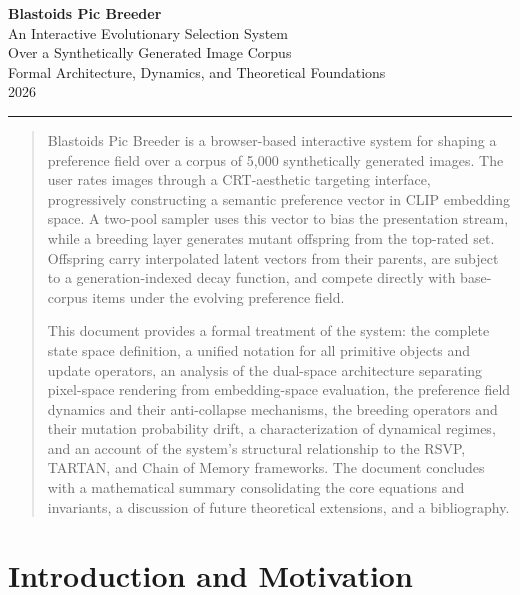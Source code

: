 \documentclass[12pt, a4paper]{article}
\theoremstyle{definition}
\begin{document}
\begin{center}
  {\Large\bfseries\color{termgreen!90!black} Blastoids Pic Breeder}\\[0.6em]
  {\large\color{commentgray} An Interactive Evolutionary Selection System\\
  Over a Synthetically Generated Image Corpus}\\[1.2em]
  {\normalsize\color{commentgray} Formal Architecture, Dynamics, and Theoretical Foundations}\\[0.4em]
  {\small\color{commentgray!70} 2026}
\end{center}

\vspace{1em}
\hrule height 0.5pt
\vspace{1.5em}

\begin{abstract}
\noindent
Blastoids Pic Breeder is a browser-based interactive system for shaping a preference field over a corpus of 5,000 synthetically generated images. The user rates images through a CRT-aesthetic targeting interface, progressively constructing a semantic preference vector in CLIP embedding space. A two-pool sampler uses this vector to bias the presentation stream, while a breeding layer generates mutant offspring from the top-rated set. Offspring carry interpolated latent vectors from their parents, are subject to a generation-indexed decay function, and compete directly with base-corpus items under the evolving preference field.

This document provides a formal treatment of the system: the complete state space definition, a unified notation for all primitive objects and update operators, an analysis of the dual-space architecture separating pixel-space rendering from embedding-space evaluation, the preference field dynamics and their anti-collapse mechanisms, the breeding operators and their mutation probability drift, a characterization of dynamical regimes, and an account of the system's structural relationship to the RSVP, TARTAN, and Chain of Memory frameworks. The document concludes with a mathematical summary consolidating the core equations and invariants, a discussion of future theoretical extensions, and a bibliography.
\end{abstract}

\vspace{1em}
\tableofcontents
\newpage

\section{Introduction and Motivation}
\end{document}
